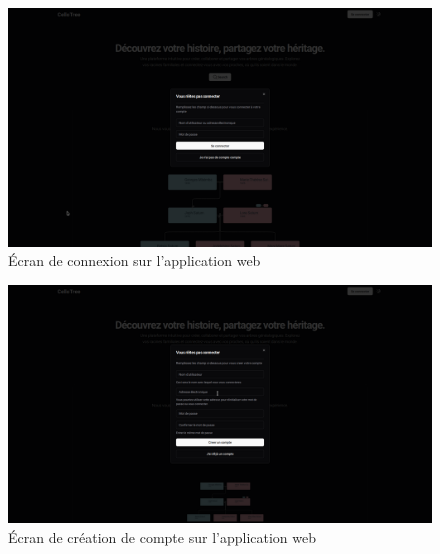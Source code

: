 %
%
%

\begin{figure}[H]
  \centering
  \includegraphics[width=1\textwidth]{capture/login.png}
\caption{Écran de connexion sur l'application web}
\end{figure}

\begin{figure}[H]
  \centering
  \includegraphics[width=1\textwidth]{capture/signup.png}
  \caption{Écran de création de compte sur l'application web}
\end{figure}

